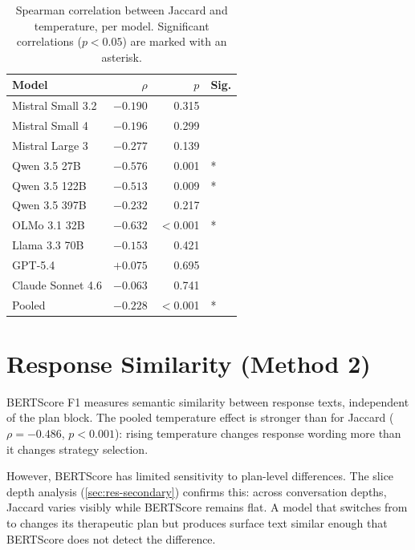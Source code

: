 \begin{table}[t]
  \centering
  \caption{Spearman correlation between Jaccard and temperature, per model.
    Significant correlations ($p < 0.05$) are marked with an asterisk.}
  \label{tab:temp-spearman}
  \begin{tabular}{lrrl}
    \toprule
    Model & $\rho$ & $p$ & Sig. \\
    \midrule
    Mistral Small 3.2  & $-0.190$ & 0.315 & \\
    Mistral Small 4    & $-0.196$ & 0.299 & \\
    Mistral Large 3    & $-0.277$ & 0.139 & \\
    Qwen 3.5 27B       & $-0.576$ & 0.001 & * \\
    Qwen 3.5 122B      & $-0.513$ & 0.009 & * \\
    Qwen 3.5 397B      & $-0.232$ & 0.217 & \\
    OLMo 3.1 32B       & $-0.632$ & $<$0.001 & * \\
    Llama 3.3 70B      & $-0.153$ & 0.421 & \\
    GPT-5.4            & $+0.075$ & 0.695 & \\
    Claude Sonnet 4.6  & $-0.063$ & 0.741 & \\
    \midrule
    Pooled             & $-0.228$ & $<$0.001 & * \\
    \bottomrule
  \end{tabular}
\end{table}


\section{Response Similarity (Method 2)}
\label{sec:res-similarity}

BERTScore F1 measures semantic similarity between response texts,
independent of the plan block. The pooled temperature effect is stronger
than for Jaccard ($\rho = -0.486$, $p < 0.001$): rising temperature
changes response wording more than it changes strategy selection.

However, BERTScore has limited sensitivity to plan-level differences.
The slice depth analysis (\autoref{sec:res-secondary}) confirms this:
across conversation depths, Jaccard varies visibly while BERTScore remains
flat. A model that switches from  to
 changes its therapeutic plan but produces
surface text similar enough that BERTScore does not detect the difference.

